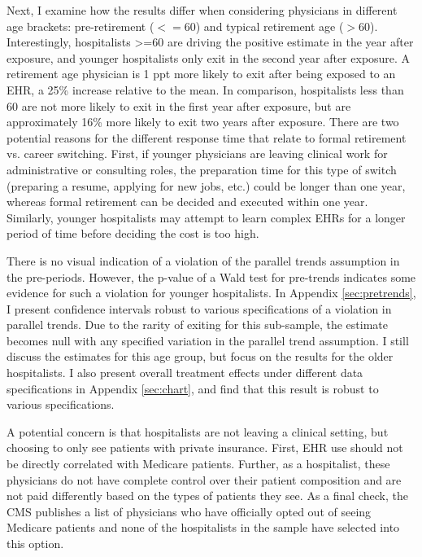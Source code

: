 \documentclass[12pt]{article}
\begin{document}
Next, I examine how the results differ when considering physicians in different age brackets: pre-retirement ($<= 60$) and typical retirement age ($> 60$). Interestingly, hospitalists >=60 are driving the positive estimate in the year after exposure, and younger hospitalists only exit in the second year after exposure. A retirement age physician is 1 ppt more likely to exit after being exposed to an EHR, a 25\% increase relative to the mean. In comparison, hospitalists less than 60 are not more likely to exit in the first year after exposure, but are approximately 16\% more likely to exit two years after exposure. There are two potential reasons for the different response time that relate to formal retirement vs. career switching. First, if younger physicians are leaving clinical work for administrative or consulting roles, the preparation time for this type of switch (preparing a resume, applying for new jobs, etc.) could be longer than one year, whereas formal retirement can be decided and executed within one year. Similarly, younger hospitalists may attempt to learn complex EHRs for a longer period of time before deciding the cost is too high. 

There is no visual indication of a violation of the parallel trends assumption in the pre-periods. However, the p-value of a Wald test for pre-trends indicates some evidence for such a violation for younger hospitalists. In Appendix \ref{sec:pretrends}, I present confidence intervals robust to various specifications of a violation in parallel trends. Due to the rarity of exiting for this sub-sample, the estimate becomes null with any specified variation in the parallel trend assumption. I still discuss the estimates for this age group, but focus on the results for the older hospitalists. I also present overall treatment effects under different data specifications in Appendix \ref{sec:chart}, and find that this result is robust to various specifications. 

A potential concern is that hospitalists are not leaving a clinical setting, but choosing to only see patients with private insurance. First, EHR use should not be directly correlated with Medicare patients. Further, as a hospitalist, these physicians do not have complete control over their patient composition and are not paid differently based on the types of patients they see. As a final check, the CMS publishes a list of physicians who have officially opted out of seeing Medicare patients and none of the hospitalists in the sample have selected into this option. 
\end{document}
